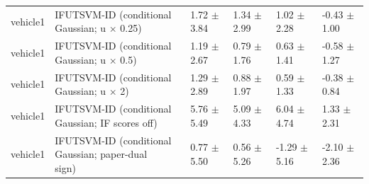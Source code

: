 \begin{table}[!t]
{\begin{tabular}{llllll}
vehicle1 & \shortstack[l]{IFUTSVM-ID (conditional\\Gaussian; u \(\times\) 0.25)} & 1.72 \(\pm\) 3.84 & 1.34 \(\pm\) 2.99 & 1.02 \(\pm\) 2.28 & -0.43 \(\pm\) 1.00 \\
vehicle1 & \shortstack[l]{IFUTSVM-ID (conditional\\Gaussian; u \(\times\) 0.5)} & 1.19 \(\pm\) 2.67 & 0.79 \(\pm\) 1.76 & 0.63 \(\pm\) 1.41 & -0.58 \(\pm\) 1.27 \\
vehicle1 & \shortstack[l]{IFUTSVM-ID (conditional\\Gaussian; u \(\times\) 2)} & 1.29 \(\pm\) 2.89 & 0.88 \(\pm\) 1.97 & 0.59 \(\pm\) 1.33 & -0.38 \(\pm\) 0.84 \\
vehicle1 & \shortstack[l]{IFUTSVM-ID (conditional\\Gaussian; IF scores off)} & 5.76 \(\pm\) 5.49 & 5.09 \(\pm\) 4.33 & 6.04 \(\pm\) 4.74 & 1.33 \(\pm\) 2.31 \\
vehicle1 & \shortstack[l]{IFUTSVM-ID (conditional\\Gaussian; paper-dual\\sign)} & 0.77 \(\pm\) 5.50 & 0.56 \(\pm\) 5.26 & -1.29 \(\pm\) 5.16 & -2.10 \(\pm\) 2.36 \\
\hline
\end{tabular}%
}
\end{table}

